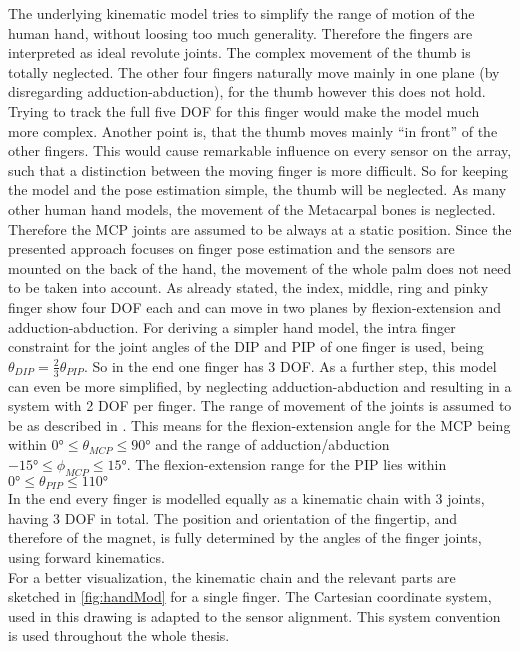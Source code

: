 The underlying kinematic model tries to simplify the range of motion of the human hand, without loosing too much generality. Therefore the fingers are interpreted as ideal revolute joints. The complex movement of the thumb is totally neglected. The other four fingers naturally move mainly in one plane (by disregarding adduction-abduction), for the thumb however this does not hold. Trying to track the full five \ac{DOF} for this finger would make the model much more complex. Another point is, that the thumb moves mainly ``in front'' of the other fingers. This would cause remarkable influence on every sensor on the array, such that a distinction between the moving finger is more difficult. So for keeping the model and the pose estimation simple, the thumb will be neglected. As many other human hand models, the movement of the Metacarpal bones is neglected. Therefore the \ac{MCP} joints are assumed to be always at a static position. Since the presented approach focuses on finger pose estimation and the sensors are mounted on the back of the hand, the movement of the whole palm does not need to be taken into account. As already stated, the index, middle, ring and pinky finger show four \ac{DOF} each and can move in two planes by flexion-extension and adduction-abduction. For deriving a simpler hand model, the intra finger constraint for the joint angles of the \ac{DIP} and \ac{PIP} of one finger is used, being $ \theta_{DIP} = \frac{2}{3} \theta_{PIP} $. So in the end one finger has 3 \ac{DOF}. As a further step, this model can even be more simplified, by neglecting adduction-abduction and resulting in a system with 2 \ac{DOF} per finger. The range of movement of the joints is assumed to be as described in \cite{lin2000modeling}. This means for the flexion-extension angle for the \ac{MCP} being within $ \ang{0} \leq \theta_{MCP} \leq \ang{90} $ and the range of adduction/abduction $ \ang{-15} \leq \phi_{MCP} \leq \ang{+15} $. The flexion-extension range for the \ac{PIP} lies within $ \ang{0} \leq \theta_{PIP} \leq \ang{110} $\\
In the end every finger is modelled equally as a kinematic chain with 3 joints, having 3 \ac{DOF} in total. The position and orientation of the fingertip, and therefore of the magnet, is fully determined by the angles of the finger joints, using forward kinematics.\\
For a better visualization, the kinematic chain and the relevant parts are sketched in \ref{fig:handMod} for a single finger. The Cartesian coordinate system, used in this drawing is adapted to the sensor alignment. This system convention is used throughout the whole thesis.
